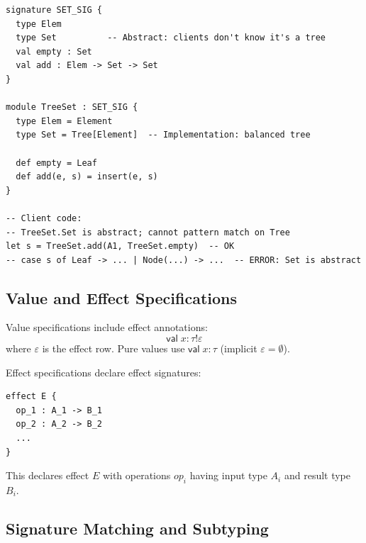 \begin{example}
\label{ex:abstract-type}
\begin{verbatim}
signature SET_SIG {
  type Elem
  type Set          -- Abstract: clients don't know it's a tree
  val empty : Set
  val add : Elem -> Set -> Set
}

module TreeSet : SET_SIG {
  type Elem = Element
  type Set = Tree[Element]  -- Implementation: balanced tree

  def empty = Leaf
  def add(e, s) = insert(e, s)
}

-- Client code:
-- TreeSet.Set is abstract; cannot pattern match on Tree
let s = TreeSet.add(A1, TreeSet.empty)  -- OK
-- case s of Leaf -> ... | Node(...) -> ...  -- ERROR: Set is abstract
\end{verbatim}
\end{example}

\subsection{Value and Effect Specifications}
\label{subsec:value-effect-specs}

\begin{definition}
\label{def:value-spec-effects}
Value specifications include effect annotations:
\[
\mathsf{val}\; x : \tau \mathbin{!} \varepsilon
\]
where $\varepsilon$ is the effect row. Pure values use $\mathsf{val}\; x : \tau$ (implicit $\varepsilon = \emptyset$).
\end{definition}

\begin{definition}
\label{def:effect-spec}
Effect specifications declare effect signatures:
\begin{verbatim}
effect E {
  op_1 : A_1 -> B_1
  op_2 : A_2 -> B_2
  ...
}
\end{verbatim}
This declares effect $E$ with operations $op_i$ having input type $A_i$ and result type $B_i$.
\end{definition}

\subsection{Signature Matching and Subtyping}
\label{subsec:signature-matching}

